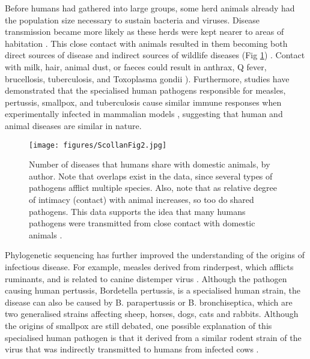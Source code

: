Before humans had gathered into large groups, some herd animals already had the population size necessary to sustain bacteria and viruses. Disease transmission became more likely as these herds were kept nearer to areas of habitation \parencite[273]{Armelagos_1970}. 
This close contact with animals resulted in them becoming both direct sources of disease and indirect sources of wildlife diseases (Fig \ref{fig:ScollanFig2}) \parencites[370]{Pearce-Duvet_2006}[446]{Daszak_2000}. 
Contact with milk, hair, animal dust, or faeces could result in anthrax, Q fever, 
brucellosis, tuberculosis, and Toxoplasma gondii \parencites[273]{Armelagos_1970}[2750]{Sibley_2009}). 
Furthermore, studies have demonstrated that the specialised human pathogens responsible for measles, 
pertussis, smallpox, and tuberculosis cause similar immune responses when experimentally 
infected in mammalian models \parencites{Norrby_1985}{Arico_1987}, 
suggesting that human and animal diseases are similar in nature.

	\begin{figure}[!htb]
		\texttt{[image: figures/ScollanFig2.jpg]}
		\caption{Number of diseases that humans share with domestic animals, by author. Note that overlaps exist in the data, since several types of pathogens afflict multiple species. 
Also, note that as relative degree of intimacy (contact) with animal increases, so too do shared pathogens. This data supports the idea that many humans pathogens were transmitted from close contact with domestic animals \parencites{McNeill_1976}{Hull_1963}.}
		\label{fig:ScollanFig2} %
	\end{figure}
Phylogenetic sequencing has further improved the understanding of the origins of infectious disease. For example, measles derived from rinderpest, which afflicts ruminants, and is related to canine distemper virus 
\parencite{Westover_2001}. Although the pathogen causing human pertussis, Bordetella pertussis, is a specialised human strain, the disease can also be caused by B. parapertussis or B. bronchiseptica, 
which are two generalised strains affecting sheep, horses, dogs, cats and rabbits\parencite[259]{Porter_1994}. 
Although the origins of smallpox are still debated, 
one possible explanation of this specialised human pathogen 
is that it derived from a similar rodent strain of the virus that was 
indirectly transmitted to humans from infected cows \parencites{Pulford_2002}[115--116]{Gubser_2004}. 

